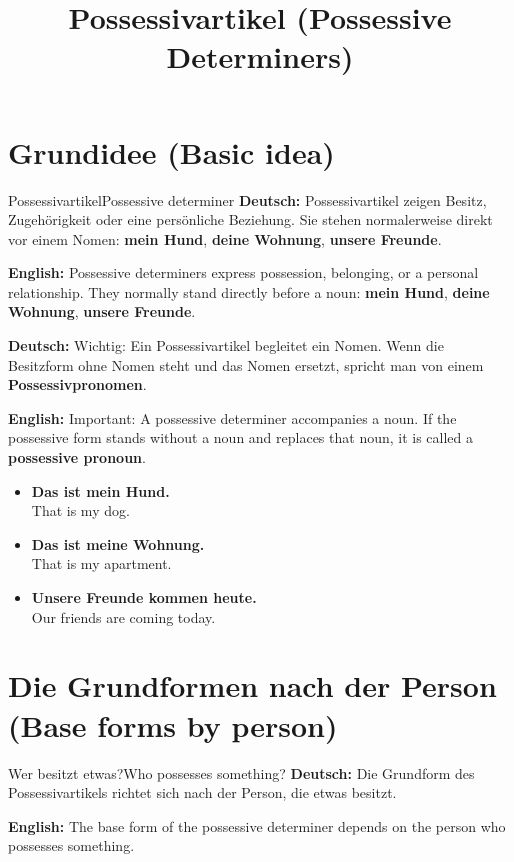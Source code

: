 \documentclass[a4paper,11pt]{article}
\title{Possessivartikel \textnormal{(Possessive Determiners)}}
\date{}
\newcommand{\GermanText}[1]{\textbf{Deutsch: }#1\par}
\newcommand{\EnglishText}[1]{{\small\color{SoftGray}\textbf{English: }#1\par}}
\newcommand{\ExampleItem}[2]{\item \textbf{#1}\\{\small\color{SoftGray}#2}}
\begin{document}
\maketitle
\tableofcontents
\newpage

\section{Grundidee \textnormal{(Basic idea)}}

\begin{grammarentry}{Possessivartikel}{Possessive determiner}
\GermanText{Possessivartikel zeigen Besitz, Zugehörigkeit oder eine persönliche Beziehung. Sie stehen normalerweise direkt vor einem Nomen: \textbf{mein Hund}, \textbf{deine Wohnung}, \textbf{unsere Freunde}.}
\EnglishText{Possessive determiners express possession, belonging, or a personal relationship. They normally stand directly before a noun: \textbf{mein Hund}, \textbf{deine Wohnung}, \textbf{unsere Freunde}.}

\GermanText{Wichtig: Ein Possessivartikel begleitet ein Nomen. Wenn die Besitzform ohne Nomen steht und das Nomen ersetzt, spricht man von einem \textbf{Possessivpronomen}.}
\EnglishText{Important: A possessive determiner accompanies a noun. If the possessive form stands without a noun and replaces that noun, it is called a \textbf{possessive pronoun}.}
\end{grammarentry}

\begin{exbox}
\begin{itemize}
\ExampleItem{Das ist mein Hund.}{That is my dog.}
\ExampleItem{Das ist meine Wohnung.}{That is my apartment.}
\ExampleItem{Unsere Freunde kommen heute.}{Our friends are coming today.}
\end{itemize}
\end{exbox}

\section{Die Grundformen nach der Person \textnormal{(Base forms by person)}}

\begin{grammarentry}{Wer besitzt etwas?}{Who possesses something?}
\GermanText{Die Grundform des Possessivartikels richtet sich nach der Person, die etwas besitzt.}
\EnglishText{The base form of the possessive determiner depends on the person who possesses something.}
\end{grammarentry}
\end{document}

